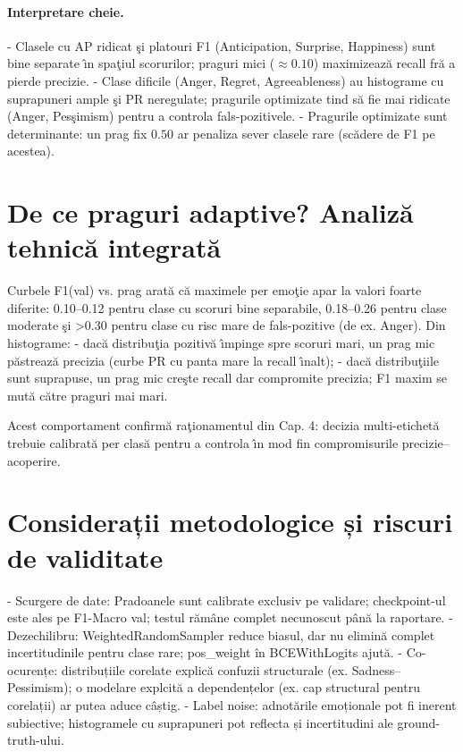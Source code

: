 \paragraph{Interpretare cheie.}
- Clasele cu AP ridicat \c{s}i platouri F1 (Anticipation, Surprise, Happiness) sunt bine separate \^{\i}n spa\c{t}iul scorurilor; praguri mici ($\approx 0.10$) maximizeaz\u{a} recall fr\u{a} a pierde precizie.
- Clase dificile (Anger, Regret, Agreeableness) au histograme cu suprapuneri ample \c{s}i PR neregulate; pragurile optimizate tind s\u{a} fie mai ridicate (Anger, Pes\c{s}imism) pentru a controla fals-pozitivele.
- Pragurile optimizate sunt determinante: un prag fix $0.50$ ar penaliza sever clasele rare (sc\u{a}dere de F1 pe acestea).

\section{De ce praguri adaptive? Analiz\u{a} tehnic\u{a} integrat\u{a}}
Curbele F1(val) vs. prag arat\u{a} c\u{a} maximele per emo\c{t}ie apar la valori foarte diferite: 0.10--0.12 pentru clase cu scoruri bine separabile, 0.18--0.26 pentru clase moderate \c{s}i >0.30 pentru clase cu risc mare de fals-pozitive (de ex. Anger). Din histograme:
- dac\u{a} distribu\c{t}ia pozitiv\u{a} \^{\i}mpinge spre scoruri mari, un prag mic p\u{a}streaz\u{a} precizia (curbe PR cu panta mare la recall \^{\i}nalt);
- dac\u{a} distribu\c{t}iile sunt suprapuse, un prag mic cre\c{s}te recall dar compromite precizia; F1 maxim se mut\u{a} c\u{a}tre praguri mai mari.

Acest comportament confirm\u{a} ra\c{t}ionamentul din Cap. 4: decizia multi-etichet\u{a} trebuie calibrat\u{a} per clas\u{a} pentru a controla \^{\i}n mod fin compromisurile precizie--acoperire.

\section{Considerații metodologice și riscuri de validitate}
- Scurgere de date: Pradoanele sunt calibrate exclusiv pe validare; checkpoint-ul este ales pe F1-Macro val; testul rămâne complet necunoscut până la raportare.
- Dezechilibru: WeightedRandomSampler reduce biasul, dar nu elimină complet incertitudinile pentru clase rare; pos\_weight în BCEWithLogits ajută.
- Co-ocurențe: distribuțiile corelate explică confuzii structurale (ex. Sadness–Pessimism); o modelare explcită a dependențelor (ex. cap structural pentru corelații) ar putea aduce câștig.
- Label noise: adnotările emoționale pot fi inerent subiective; histogramele cu suprapuneri pot reflecta și incertitudini ale ground-truth-ului.


